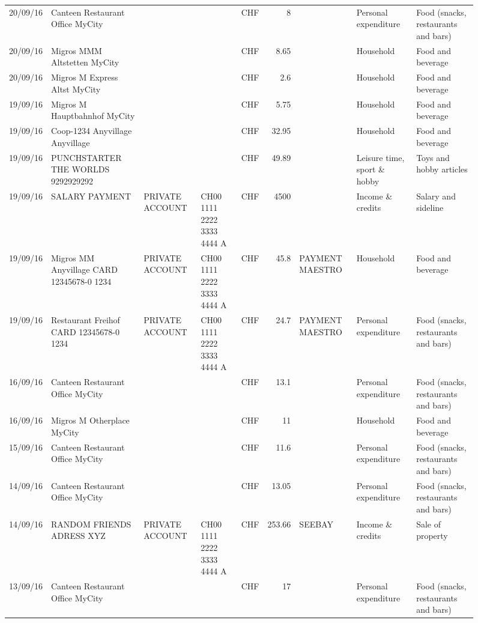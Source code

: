 \begin{landscape}
\begin{sidewaysfigure}
\begin{table}[h]
\begin{center}
\begin{tabular}{rllllrlll}
		20/09/16 & Canteen Restaurant Office      MyCity &       &       & CHF   & 8     &       & Personal expenditure & Food (snacks, restaurants and bars) \\
		20/09/16 & Migros MMM Altstetten    MyCity &       &       & CHF   & 8.65  &       & Household & Food and beverage \\
		20/09/16 & Migros M Express Altst   MyCity &       &       & CHF   & 2.6   &       & Household & Food and beverage \\
		19/09/16 & Migros M Hauptbahnhof    MyCity &       &       & CHF   & 5.75  &       & Household & Food and beverage \\
		19/09/16 & Coop-1234 Anyvillage    Anyvillage &       &       & CHF   & 32.95 &       & Household & Food and beverage \\
		19/09/16 & PUNCHSTARTER THE WORLDS   9292929292 &       &       & CHF   & 49.89 &       & Leisure time, sport \& hobby & Toys and hobby articles \\
		19/09/16 & SALARY PAYMENT & PRIVATE ACCOUNT & CH00 1111 2222 3333 4444 A & CHF   & 4500  &       & Income \& credits & Salary and sideline \\
		19/09/16 & Migros MM Anyvillage CARD 12345678-0 1234 & PRIVATE ACCOUNT & CH00 1111 2222 3333 4444 A & CHF   & 45.8  & PAYMENT MAESTRO & Household & Food and beverage \\
		19/09/16 & Restaurant Freihof CARD 12345678-0 1234 & PRIVATE ACCOUNT & CH00 1111 2222 3333 4444 A & CHF   & 24.7  & PAYMENT MAESTRO & Personal expenditure & Food (snacks, restaurants and bars) \\
		16/09/16 & Canteen Restaurant Office      MyCity &       &       & CHF   & 13.1  &       & Personal expenditure & Food (snacks, restaurants and bars) \\
		16/09/16 & Migros M Otherplace   MyCity &       &       & CHF   & 11    &       & Household & Food and beverage \\
		15/09/16 & Canteen Restaurant Office      MyCity &       &       & CHF   & 11.6  &       & Personal expenditure & Food (snacks, restaurants and bars) \\
		14/09/16 & Canteen Restaurant Office      MyCity &       &       & CHF   & 13.05 &       & Personal expenditure & Food (snacks, restaurants and bars) \\
		14/09/16 & RANDOM FRIENDS ADRESS XYZ & PRIVATE ACCOUNT & CH00 1111 2222 3333 4444 A & CHF   & 253.66 & SEEBAY & Income \& credits & Sale of property \\
		13/09/16 & Canteen Restaurant Office      MyCity &       &       & CHF   & 17    &       & Personal expenditure & Food (snacks, restaurants and bars) \\

\end{tabular}
\end{center}
\end{table}
\end{sidewaysfigure}
\end{landscape}
